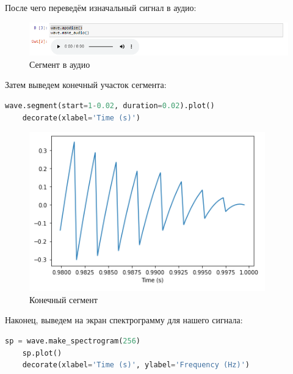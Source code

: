 \documentclass[a4paper]{article}
\begin{document}
            После чего переведём изначальный сигнал в аудио:
            
            \begin{figure}[H]
                \centering
                \includegraphics[width=\textwidth]{ex_2_wave_audio.png}
                \caption{Сегмент в аудио}
                \label{fig:ex_2_wave_audio}
            \end{figure}
            
            Затем выведем конечный участок сегмента:
            
\begin{lstlisting}[language=Python, caption= Получение конечного сегмента]
    wave.segment(start=1-0.02, duration=0.02).plot()
    decorate(xlabel='Time (s)')
\end{lstlisting}               
            
            \begin{figure}[H]
                \centering
                \includegraphics{ex_2_segment_end.png}
                \caption{Конечный сегмент}
                \label{fig:ex_2_segment_end}
            \end{figure}
            
            Наконец, выведем на экран спектрограмму для нашего сигнала:
            
\begin{lstlisting}[language=Python, caption= Спектограмма сигнала]
    sp = wave.make_spectrogram(256)
    sp.plot()
    decorate(xlabel='Time (s)', ylabel='Frequency (Hz)')
\end{lstlisting}               
            
\end{document}
